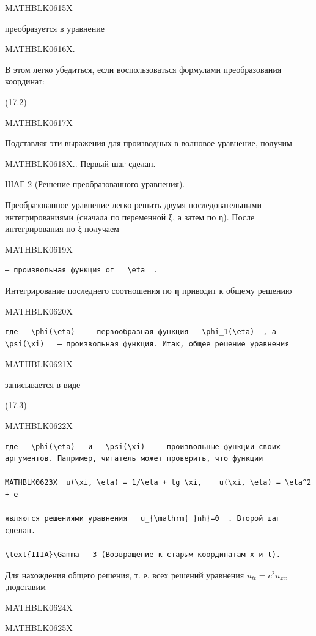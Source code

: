 \documentclass[
]{article}
\begin{document}
MATHBLK0615X

преобразуется в уравнение

MATHBLK0616X.

В этом легко убедиться, если воспользоваться формулами преобразования
координат:

(17.2)

MATHBLK0617X

Подставляя эти выражения для производных в волновое уравнение, получим

MATHBLK0618X.. Первый шаг сделан.

ШАГ 2 (Решение преобразованного уравнения).

Преобразованное уравнение легко решить двумя последовательными
интегрированиями (сначала по переменной ξ, а затем по η). После
интегрирования по ξ получаем

MATHBLK0619X

\begin{verbatim}
— произвольная функция от   \eta  .
\end{verbatim}

Интегрирование последнего соотношения по \textbf{η} приводит к общему
решению

MATHBLK0620X

\begin{verbatim}
где   \phi(\eta)   — первообразная функция   \phi_1(\eta)  , а   \psi(\xi)   — произвольная функция. Итак, общее решение уравнения
\end{verbatim}

MATHBLK0621X

записывается в виде

(17.3)

MATHBLK0622X

\begin{verbatim}
где   \phi(\eta)   и   \psi(\xi)   — произвольные функции своих аргументов. Папример, читатель может проверить, что функции

MATHBLK0623X  u(\xi, \eta) = 1/\eta + tg \xi,    u(\xi, \eta) = \eta^2 + e

являются решениями уравнения   u_{\mathrm{ }nh}=0  . Второй шаг сделан.

\text{IIIA}\Gamma   3 (Возвращение к старым координатам x и t).
\end{verbatim}

Для нахождения общего решения, т. е. всех решений уравнения
\(u_{tt} = c^2 u_{xx}\),подставим

MATHBLK0624X

MATHBLK0625X
\end{document}
